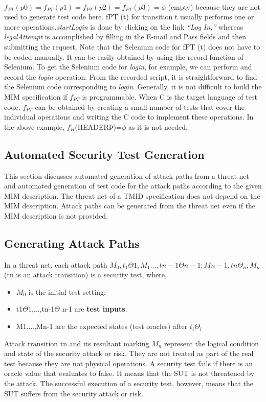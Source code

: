 \paragraph{}
$f_{PT}(p0) = f_{PT}(p1) = f_{PT}(p2) = f_{PT}(p3)=\phi$ (empty) because they are not used to generate test code here. fPT (t) for transition t usually performs one or more operations.\textit{startLogin} is done by clicking on the link \textit{“Log In,”} whereas \textit{legalAttempt} is accomplished by filling in the E-mail and Pass fields and then submitting the request. Note that the Selenium code for fPT (t) does not have to be coded manually. It can be easily obtained by using the record function of Selenium. To get the Selenium code for \textit{login}, for example, we can perform and record the \textit{login} operation. From the recorded script, it is straightforward to find the Selenium code corresponding to \textit{login}. Generally, it is not difficult to build the MIM specification if $f_{PT}$ is programmable. When C is the target language of test code, $f_{PT}$ can be obtained by creating a small number of tests that cover the individual operations and writing the C code to implement these operations. In the above example, $f_H$(HEADERÞ)=$\phi$ as it is not needed.
\newpage
\begin{center}
\section{Automated Security Test Generation}

\end{center}
This section discusses automated generation of attack paths
from a threat net and automated generation of test code for
the attack paths according to the given MIM description. The
threat net of a TMID specification does not depend on the
MIM description. Attack paths can be generated from the
threat net even if the MIM description is not provided.
\subsection{Generating Attack Paths}
In a threat net, each attack path $M_0,t_1\Theta1, M_1...,tn-1\Theta n-1;
Mn-1,tn\Theta_n,M_n$(tn is an attack transition) is a security test,
where,
\begin{itemize}
\item $M_0$ is the initial test setting;
\item t1$\Theta1$,...,tn-1$\Theta$ n-1 are \textbf{test inputs}.
\item M1,...,Mn-1 are the expected states (test oracles) after $t_i\Theta_i$
\end{itemize}
Attack transition tn and its resultant marking $M_n$ represent
the logical condition and state of the security attack or risk.
They are not treated as part of the real test because they are
not physical operations. A security test fails if there is an
oracle value that evaluates to false. It means that the SUT is
not threatened by the attack. The successful execution of a
security test, however, means that the SUT suffers from the
security attack or risk.
